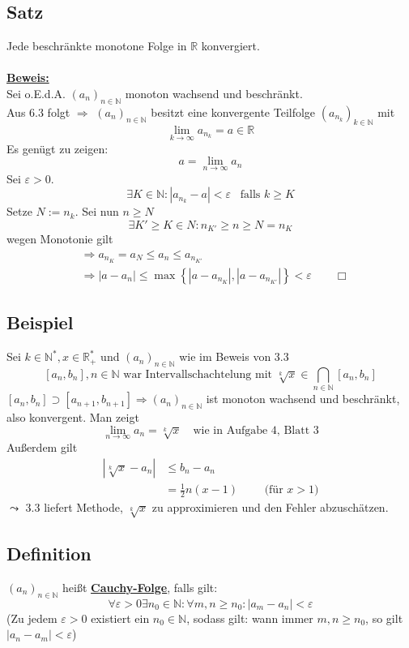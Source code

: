 \subsection{Satz} %
\label{sub:satz}
Jede beschränkte monotone Folge in $\mathds{R}$ konvergiert.\\
\vspace{\baselineskip} \\
\underline{\textbf{Beweis:}} \\
Sei o.E.d.A. $(a_n)_{n \in \mathds{N}}$ monoton wachsend und beschränkt. \\
Aus 6.3 folgt $\Rightarrow$ $(a_n)_{n \in \mathds{N}}$ besitzt eine konvergente Teilfolge $(a_{n_k})_{k \in \mathds{N}}$ mit 
\[
	\lim\limits_{k \to \infty} a_{n_k} = a \in \mathds{R}
\]
Es genügt zu zeigen:
\[
	a = \lim\limits_{n \to \infty} a_n
\]
Sei $\varepsilon > 0$. 
\[
	\exists K \in \mathds{N} : |a_{n_k} -a| < \varepsilon \enspace \text{ falls } k \geq K
\]
Setze $N:= n_k$. Sei nun $n\geq N$
\[
	\exists K' \geq K \in N : n_{K'} \geq n \geq N = n_K
\]
wegen Monotonie gilt
\begin{align*}
	&\Rightarrow a_{n_K} = a_N \leq a_n \leq a_{n_{K'}} \\
	&\Rightarrow |a-a_n| \leq \max \left\{ |a- a_{n_K}|, |a- a_{n_{K'}}| \right\} < \varepsilon \qquad \Box
\end{align*}

\subsection{Beispiel} %
\label{sub:beispiel}
Sei $k \in \mathds{N}^* , x \in \mathds{R}^*_+$ und $(a_n)_{n \in \mathds{N}}$ wie im Beweis von 3.3
\[
	[a_n , b_n], n \in \mathds{N} \text{ war Intervallschachtelung mit } \sqrt[k]{x}  \in \bigcap_{n \in \mathds{N}} [a_n , b_n]
\]
$[a_n , b_n] \supset [a_{n+1} , b_{n+1}] \Rightarrow (a_n)_{n \in \mathds{N}}$ ist monoton wachsend und beschränkt, also konvergent. Man zeigt
\[
	\lim\limits_{n \to \infty} a_n = \sqrt[k]{x} \quad \text{wie in Aufgabe 4, Blatt 3}
\]
Außerdem gilt
\begin{align*}
	\left| \sqrt[k]{x} - a_n \right| &\leq b_n - a_n \\
	&= \frac{1}{2} n (x-1) \qquad \text{ (für $x>1$)}
\end{align*}
$\leadsto$ 3.3 liefert Methode, $\sqrt[k]{x}$ zu approximieren und den Fehler abzuschätzen.

\subsection{Definition} %
\label{sub:definition}
$(a_n)_{n \in \mathds{N}}$ heißt \underline{\textbf{Cauchy-Folge}}, falls gilt:
\[
	\forall \varepsilon > 0 \exists n_0 \in \mathds{N} : \forall m,n \geq n_0 : |a_m - a_n| < \varepsilon
\]
 (Zu jedem $\varepsilon >0$ existiert ein $n_0 \in \mathds{N}$, sodass gilt: wann immer $m,n \geq n_0$, so gilt $|a_n - a_m| < \varepsilon$)

